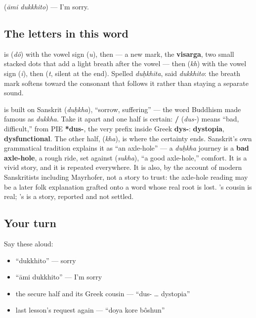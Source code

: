   (\emph{āmi dukkhito}) — I'm sorry.

\subsection*{The letters in this word}
\textbf{} is \textbf{} (\emph{dô}) with the vowel sign \textbf{} (\emph{u}), then \textbf{} — a new mark, the \textbf{visarga}, two small stacked dots that add a light breath after the vowel — then \textbf{} (\emph{kh}) with the vowel sign \textbf{} (\emph{i}), then \textbf{} (\emph{t}, silent at the end). Spelled \emph{duḥkhita}, said \emph{dukkhito}: the breath mark softens toward the consonant that follows it rather than staying a separate sound.

\begin{cousinweb}
\textbf{} is built on Sanskrit \textbf{} (\emph{duḥkha}), \textquotedblleft{}sorrow, suffering\textquotedblright{} — the word Buddhism made famous as \emph{dukkha}. Take it apart and one half is certain: \textbf{/} (\emph{dus-}) means \textquotedblleft{}bad, difficult,\textquotedblright{} from PIE \textbf{*dus-}, the very prefix inside Greek \textbf{dys-}: \textbf{dystopia}, \textbf{dysfunctional}. The other half, \textbf{} (\emph{kha}), is where the certainty ends. Sanskrit's own grammatical tradition explains it as \textquotedblleft{}an axle-hole\textquotedblright{} — a \emph{duḥkha} journey is a \textbf{bad axle-hole}, a rough ride, set against \textbf{} (\emph{sukha}), \textquotedblleft{}a good axle-hole,\textquotedblright{} comfort. It is a vivid story, and it is repeated everywhere. It is also, by the account of modern Sanskritists including Mayrhofer, not a story to trust: the axle-hole reading may be a later folk explanation grafted onto a word whose real root is lost. 's cousin is real; 's is a story, reported and not settled.
\end{cousinweb}

\subsection*{Your turn}
Say these aloud:

\begin{itemize}
\raggedright
  \item \textquotedblleft{}dukkhito\textquotedblright{} — sorry
  \item \textquotedblleft{}āmi dukkhito\textquotedblright{} — I'm sorry
  \item the secure half and its Greek cousin — \textquotedblleft{}dus- … dystopia\textquotedblright{}
  \item last lesson's request again — \textquotedblleft{}doya kore bôshun\textquotedblright{}
\end{itemize}

